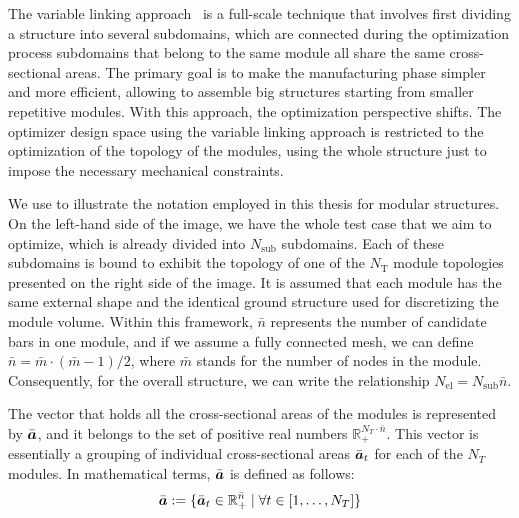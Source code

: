 The variable linking approach~ is a full-scale technique that involves first dividing a structure into several subdomains, which are connected during the optimization process \ie subdomains that belong to the same module all share the same cross-sectional areas. The primary goal is to make the manufacturing phase simpler and more efficient, allowing to assemble big structures starting from smaller repetitive modules. With this approach, the optimization perspective shifts. The optimizer design space using the variable linking approach is restricted to the optimization of the topology of the modules, using the whole structure just to impose the necessary mechanical constraints.

We use  to illustrate the notation employed in this thesis for modular structures. On the left-hand side of the image, we have the whole test case that we aim to optimize, which is already divided into $N_\text{sub}$ subdomains. Each of these subdomains is bound to exhibit the topology of one of the $N_\text{T}$ module topologies presented on the right side of the image. It is assumed that each module has the same external shape and the identical ground structure used for discretizing the module volume. Within this framework, $\bar{n}$ represents the number of candidate bars in one module, and if we assume a fully connected mesh, we can define $\bar{n} = \bar{m} \cdot (\bar{m}-1)/2$, where $\bar{m}$ stands for the number of nodes in the module. Consequently, for the overall structure, we can write the relationship $N_{\text{el}} = N_{\text{sub}}\bar{n}$.

The vector that holds all the cross-sectional areas of the modules is represented by $\bar{\bm{a}}$, and it belongs to the set of positive real numbers $\mathbb{R}_+^{N_T \cdot \bar{n}}$. This vector is essentially a grouping of individual cross-sectional areas $\bar{\bm{a}}_t$ for each of the $N_T$ modules. In mathematical terms, $\bar{\bm{a}}$ is defined as follows:
\begin{equation}
    \bar{\bm{a}} :=  \{ \bar{\bm{a}}_t \in \mathbb{R}_+^{\bar{n}} \;|\; \forall t \in [1,\dots,N_T]\}
\end{equation}

